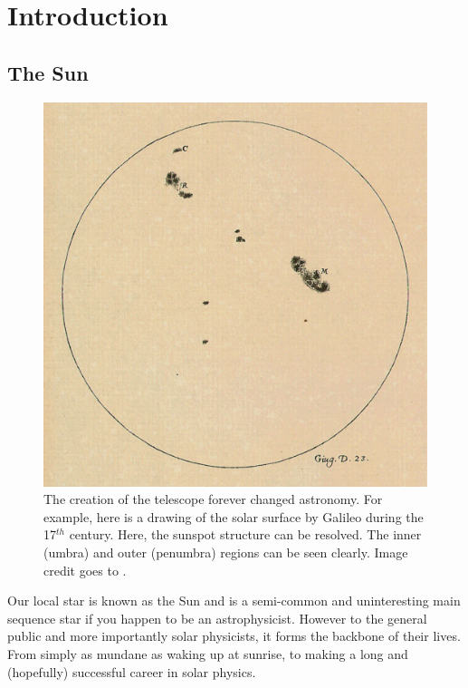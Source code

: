 \graphicspath{{Chapter1/Figs/}}

\chapter{Introduction}
      	
   \vspace*{\fill}\par
   \pagebreak

\section{The Sun}

    \begin{figure}
        \centering
        \includegraphics[width=\textwidth]{23_June_1613.pdf}
        \caption{
                 The creation of the telescope forever changed astronomy.
                 For example, here is a drawing of the solar surface by Galileo during the 17$^{{th}}$ century. 
                 Here, the sunspot structure can be resolved.
                 The inner (umbra) and outer (penumbra) regions can be seen clearly.
                 Image credit goes to \cite{galileo}.
               }
        \label{fig:galileo}
    \end{figure}
     
    Our local star is known as the Sun and is a semi-common and uninteresting main sequence star if you happen to be an astrophysicist.
    However to the general public and more importantly solar physicists, it forms the backbone of their lives.
    From simply as mundane as waking up at sunrise, to making a long and (hopefully) successful career in solar physics.
    

